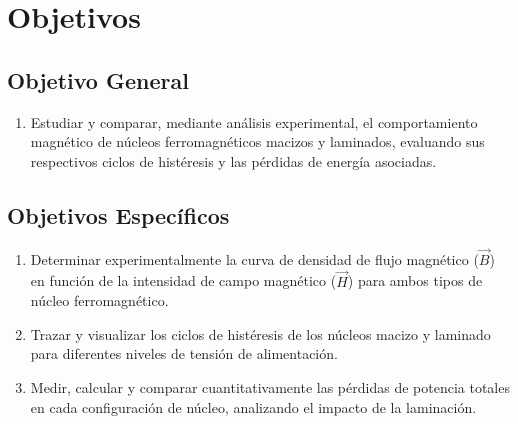 \section{Objetivos}
\subsection*{Objetivo General}

\begin{enumerate}
    \item Estudiar y comparar, mediante análisis experimental, el comportamiento magnético de núcleos ferromagnéticos macizos y laminados, evaluando sus respectivos ciclos de histéresis y las pérdidas de energía asociadas.
\end{enumerate}

\subsection*{Objetivos Específicos}
\begin{enumerate}
    \item Determinar experimentalmente la curva de densidad de flujo magnético ($\vec{B}$) en función de la intensidad de campo magnético ($\vec{H}$) para ambos tipos de núcleo ferromagnético.
    \item Trazar y visualizar los ciclos de histéresis de los núcleos macizo y laminado para diferentes niveles de tensión de alimentación.
    \item Medir, calcular y comparar cuantitativamente las pérdidas de potencia totales en cada configuración de núcleo, analizando el impacto de la laminación.
\end{enumerate}
